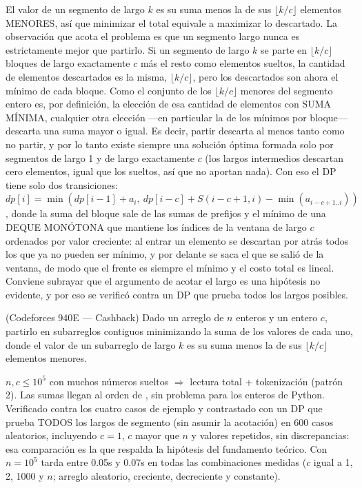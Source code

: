  El valor de un segmento de largo $k$ es su suma menos la de sus $\lfloor k/c \rfloor$ elementos MENORES, así que minimizar el total equivale a maximizar lo descartado. La observación que acota el problema es que un segmento largo nunca es estrictamente mejor que partirlo. Si un segmento de largo $k$ se parte en $\lfloor k/c \rfloor$ bloques de largo exactamente $c$ más el resto como elementos sueltos, la cantidad de elementos descartados es la misma, $\lfloor k/c \rfloor$, pero los descartados son ahora el mínimo de cada bloque. Como el conjunto de los $\lfloor k/c \rfloor$ menores del segmento entero es, por definición, la elección de esa cantidad de elementos con SUMA MÍNIMA, cualquier otra elección —en particular la de los mínimos por bloque— descarta una suma mayor o igual. Es decir, partir descarta al menos tanto como no partir, y por lo tanto existe siempre una solución óptima formada solo por segmentos de largo 1 y de largo exactamente $c$ (los largos intermedios descartan cero elementos, igual que los sueltos, así que no aportan nada). Con eso el DP tiene solo dos transiciones: $dp[i] = \min(dp[i-1] + a_i,\ dp[i-c] + S(i-c+1, i) - \min(a_{i-c+1..i}))$, donde la suma del bloque sale de las sumas de prefijos y el mínimo de una DEQUE MONÓTONA que mantiene los índices de la ventana de largo $c$ ordenados por valor creciente: al entrar un elemento se descartan por atrás todos los que ya no pueden ser mínimo, y por delante se saca el que se salió de la ventana, de modo que el frente es siempre el mínimo y el costo total es lineal. Conviene subrayar que el argumento de acotar el largo es una hipótesis no evidente, y por eso se verificó contra un DP que prueba todos los largos posibles.


(Codeforces 940E — Cashback) Dado un arreglo de $n$ enteros y un entero $c$, partirlo en subarreglos contiguos minimizando la suma de los valores de cada uno, donde el valor de un subarreglo de largo $k$ es su suma menos la de sus $\lfloor k/c \rfloor$ elementos menores.

 $n, c \le 10^5$ con muchos números sueltos $\Rightarrow$ lectura total + tokenización (patrón 2). Las sumas llegan al orden de , sin problema para los enteros de Python. Verificado contra los cuatro casos de ejemplo y contrastado con un DP que prueba TODOS los largos de segmento (sin asumir la acotación) en 600 casos aleatorios, incluyendo $c = 1$, $c$ mayor que $n$ y valores repetidos, sin discrepancias: esa comparación es la que respalda la hipótesis del fundamento teórico. Con $n = 10^5$ tarda entre \aprox{}0.05s y \aprox{}0.07s en todas las combinaciones medidas ($c$ igual a 1, 2, 1000 y $n$; arreglo aleatorio, creciente, decreciente y constante).

